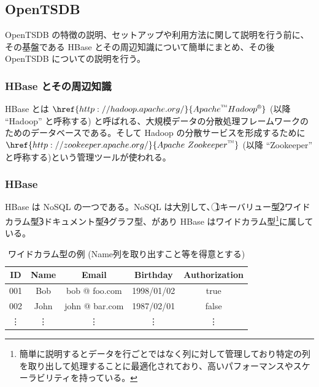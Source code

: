 \documentclass[dvipdfmx]{scrartcl}
\begin{document}
\newpage
\subsection{OpenTSDB}
\label{sec:org80da862}
OpenTSDB の特徴の説明、セットアップや利用方法に関して説明を行う前に、その基盤である HBase とその周辺知識について簡単にまとめ、その後 OpenTSDB についての説明を行う。\\

\subsubsection{HBase とその周辺知識}
\label{sec:org9abe23c}
HBase とは \(\href{http://hadoop.apache.org/}{Apache \textsuperscript{\texttrademark} Hadoop \textsuperscript{\textregistered}}\) (以降 ``Hadoop'' と呼称する) と呼ばれる、大規模データの分散処理フレームワークのためのデータベースである。そして Hadoop の分散サービスを形成するために \(\href{http://zookeeper.apache.org/}{Apache \ Zookeeper \textsuperscript{\texttrademark}}\) (以降 ``Zookeeper'' と呼称する)という管理ツールが使われる。\\
\subsubsection{HBase}
\label{sec:org34f3c57}
HBase は NoSQL の一つである。NoSQL は大別して、\textcircled{\scriptsize 1}キーバリュー型\textcircled{\scriptsize 2}ワイドカラム型\textcircled{\scriptsize 3}ドキュメント型\textcircled{\scriptsize 4}グラフ型、があり HBase はワイドカラム型\footnote{簡単に説明するとデータを行ごとではなく列に対して管理しており特定の列を取り出して処理することに最適化されており、高いパフォーマンスやスケーラビリティを持っている。}に属している。\\

\begin{table}[htbp]
\caption{ワイドカラム型の例 (Name列を取り出すこと等を得意とする)}
\centering
\begin{tabular}{|c|c|c|c|c|}
\hline
ID & Name & Email & Birthday & Authorization\\
\hline
001 & Bob & bob @ foo.com & 1998/01/02 & true\\
002 & John & john @ bar.com & 1987/02/01 & false\\
\vdots & \vdots & \vdots & \vdots & \vdots\\
\hline
\end{tabular}
\end{table}
\end{document}
